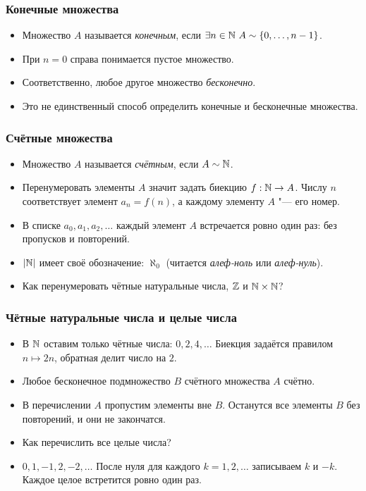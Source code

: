 \documentclass[10pt]{beamer}
\begin{document}
\begin{frame}
    \frametitle{Конечные множества}
    \begin{itemize}
        \item Множество $A$ называется \emph{конечным}, если $\exists n \in \mathbb{N}~A \sim \{0,\dots,n-1\}$.
        \item При $n=0$ справа понимается пустое множество.
        \item Соответственно, любое другое множество \emph{бесконечно}.
        \item Это не единственный способ определить конечные и бесконечные множества.
    \end{itemize}
\end{frame}

\begin{frame}
    \frametitle{Счётные множества}
    \begin{itemize}
        \item Множество $A$ называется \emph{счётным}, если $A \sim \mathbb{N}$.
        \item Перенумеровать элементы $A$ значит задать биекцию $f:\mathbb{N}\to A$. Числу $n$ соответствует элемент $a_n=f(n)$, а каждому элементу $A$ "--- его номер.
        \item В списке $a_0,a_1,a_2,\ldots$ каждый элемент $A$ встречается ровно один раз: без пропусков и повторений.
        \item $|\mathbb{N}|$ имеет своё обозначение: $\aleph_0$ (читается \emph{алеф-ноль} или \emph{алеф-нуль}).
        \item Как перенумеровать чётные натуральные числа, $\mathbb{Z}$ и $\mathbb{N}\times\mathbb{N}$?
    \end{itemize}
\end{frame}

\begin{frame}
    \frametitle{Чётные натуральные числа и целые числа}
    \begin{itemize}
        \item В $\mathbb{N}$ оставим только чётные числа: $0,2,4,\ldots$ Биекция задаётся правилом $n\mapsto 2n$, обратная делит число на $2$.
        \item<2-> Любое бесконечное подмножество $B$ счётного множества $A$ счётно.
        \item<3-> В перечислении $A$ пропустим элементы вне $B$. Останутся все элементы $B$ без повторений, и они не закончатся.
        \item<4-> Как перечислить все целые числа?
        \item<5-> $0,1,-1,2,-2,\ldots$ После нуля для каждого $k=1,2,\ldots$ записываем $k$ и $-k$. Каждое целое встретится ровно один раз.
    \end{itemize}
\end{frame}
\end{document}
